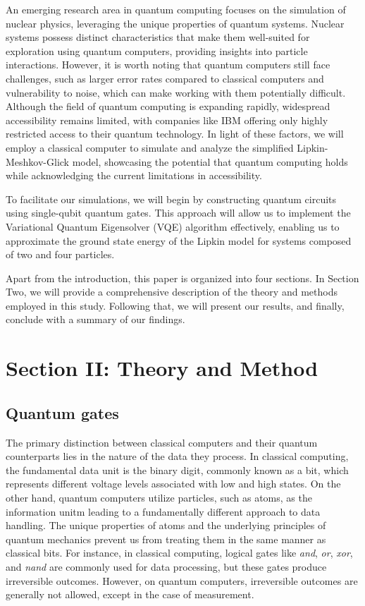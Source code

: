 \documentclass[onecolumn,10pt,cleanfoot]{asme2ej}
\begin{document}
An emerging research area in quantum computing focuses on the simulation of nuclear physics, leveraging the unique properties of quantum systems. Nuclear systems possess distinct characteristics that make them well-suited for exploration using quantum computers, providing insights into particle interactions. However, it is worth noting that quantum computers still face challenges, such as larger error rates compared to classical computers and vulnerability to noise, which can make working with them potentially difficult. Although the field of quantum computing is expanding rapidly, widespread accessibility remains limited, with companies like IBM offering only highly restricted access to their quantum technology. In light of these factors, we will employ a classical computer to simulate and analyze the simplified Lipkin-Meshkov-Glick model, showcasing the potential that quantum computing holds while acknowledging the current limitations in accessibility.

To facilitate our simulations, we will begin by constructing quantum circuits using single-qubit quantum gates. This approach will allow us to implement the Variational Quantum Eigensolver (VQE) algorithm effectively, enabling us to approximate the ground state energy of the Lipkin model for systems composed of two and four particles.

Apart from the introduction, this paper is organized into four sections. In Section Two, we will provide a comprehensive description of the theory and methods employed in this study. Following that, we will present our results, and finally, conclude with a summary of our findings.
 
 \section{\textbf{Section II: Theory and Method \\}}

 \subsection{Quantum gates}
The primary distinction between classical computers and their quantum counterparts lies in the nature of the data they process. In classical computing, the fundamental data unit is the binary digit, commonly known as a bit, which represents different voltage levels associated with low and high states. On the other hand, quantum computers utilize particles, such as atoms, as the information unitm leading to a fundamentally different approach to data handling. The unique properties of atoms and the underlying principles of quantum mechanics prevent us from treating them in the same manner as classical bits. For instance, in classical computing, logical gates like \textit{and}, \textit{or}, \textit{xor}, and \textit{nand} are commonly used for data processing, but these gates produce irreversible outcomes. However, on quantum computers, irreversible outcomes are generally not allowed, except in the case of measurement.
\end{document}
